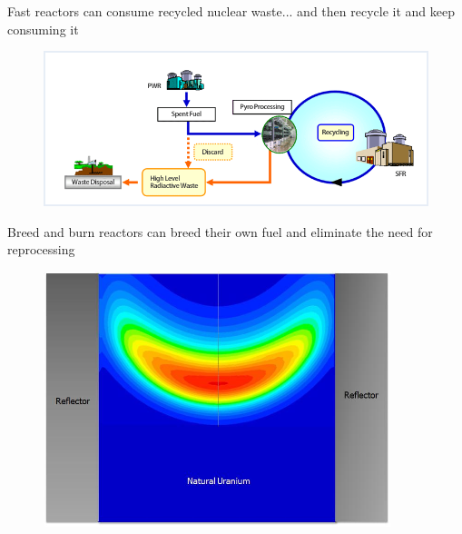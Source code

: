 \documentclass{beamer}
\begin{document}
    \begin{frame}{Fast reactors can consume recycled nuclear waste}{... and then recycle it and keep consuming it}
        \begin{figure}
            \centering
            \includegraphics[width=1.0\textwidth]{./img/fastCycle.png}
            \caption*{}
        \end{figure}
    \end{frame}

    \begin{frame}{Breed and burn reactors can breed their own fuel and eliminate the need for reprocessing}
        \begin{figure}
            \centering
            \includegraphics[width=0.9\textwidth]{./img/candle.png}
            \caption*{}
        \end{figure}
    \end{frame}
\end{document}
